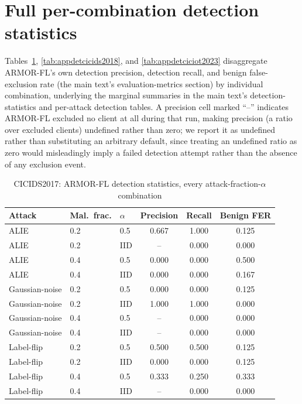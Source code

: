 \documentclass[a4paper,11pt]{article}
\begin{document}
\section{Full per-combination detection statistics}\label{app:detection}

Tables~\ref{tab:appdetcicids2017}, \ref{tab:appdetcicids2018}, and \ref{tab:appdetciciot2023} disaggregate ARMOR-FL's own detection precision, detection recall, and benign false-exclusion rate (the main text's evaluation-metrics section) by individual combination, underlying the marginal summaries in the main text's detection-statistics and per-attack detection tables. A precision cell marked ``--'' indicates ARMOR-FL excluded no client at all during that run, making precision (a ratio over excluded clients) undefined rather than zero; we report it as undefined rather than substituting an arbitrary default, since treating an undefined ratio as zero would misleadingly imply a failed detection attempt rather than the absence of any exclusion event.

\begin{table}[htbp]
\centering
\caption{CICIDS2017: ARMOR-FL detection statistics, every attack-fraction-$\alpha$ combination}\label{tab:appdetcicids2017}
\begin{tabular}{@{}lllccc@{}}
\toprule
Attack & Mal.\ frac. & $\alpha$ & Precision & Recall & Benign FER \\
\midrule
ALIE & 0.2 & 0.5 & 0.667 & 1.000 & 0.125 \\
ALIE & 0.2 & IID & -- & 0.000 & 0.000 \\
ALIE & 0.4 & 0.5 & 0.000 & 0.000 & 0.500 \\
ALIE & 0.4 & IID & 0.000 & 0.000 & 0.167 \\
Gaussian-noise & 0.2 & 0.5 & 0.000 & 0.000 & 0.125 \\
Gaussian-noise & 0.2 & IID & 1.000 & 1.000 & 0.000 \\
Gaussian-noise & 0.4 & 0.5 & -- & 0.000 & 0.000 \\
Gaussian-noise & 0.4 & IID & -- & 0.000 & 0.000 \\
Label-flip & 0.2 & 0.5 & 0.500 & 0.500 & 0.125 \\
Label-flip & 0.2 & IID & 0.000 & 0.000 & 0.125 \\
Label-flip & 0.4 & 0.5 & 0.333 & 0.250 & 0.333 \\
Label-flip & 0.4 & IID & -- & 0.000 & 0.000 \\
\bottomrule
\end{tabular}
\end{table}
\end{document}
